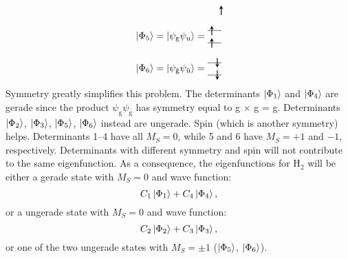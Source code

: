 \documentclass[../Main/chem532-notes.tex]{subfiles}
\begin{document}
\begin{align}
\begin{tikzpicture}[baseline={([yshift=-.5ex]current bounding box.center)},vertex/.style={anchor=base, minimum size=18pt, inner sep=2pt}]
    \draw[thick,->,>=stealth] (0.15,0.55) -- (0.15,0.9);
  \end{tikzpicture}\\[6pt]
      \ket{\Phi_5} = \ket{\psi_{\mathrm{g}}\psi_{\mathrm{u}}} 
=
  \begin{tikzpicture}[baseline={([yshift=-.5ex]current bounding box.center)},vertex/.style={anchor=base, minimum size=18pt, inner sep=2pt}]
    \draw (0,0.275) -- (0.5,0.275);
    \draw (0,0.725) -- (0.5,0.725);
    \draw[thick,->,>=stealth] (0.15,0.1) -- (0.15,0.45);
    \draw[thick,->,>=stealth] (0.15,0.55) -- (0.15,0.9);
  \end{tikzpicture}\\[6pt]
        \ket{\Phi_6} = \ket{\psi_{\bar{\mathrm{g}}}\psi_{\bar{\mathrm{u}}}} 
=
  \begin{tikzpicture}[baseline={([yshift=-.5ex]current bounding box.center)},vertex/.style={anchor=base, minimum size=18pt, inner sep=2pt}]
    \draw (0,0.275) -- (0.5,0.275);
    \draw (0,0.725) -- (0.5,0.725);
    \draw[thick,<-,>=stealth] (0.35,0.55) -- (0.35,0.9);
    \draw[thick,<-,>=stealth] (0.35,0.1) -- (0.35,0.45);
  \end{tikzpicture}
\end{align}
Symmetry greatly simplifies this problem.
The determinants $\ket{\Phi_1}$ and $\ket{\Phi_4}$ are gerade since the product $\psi_{\mathrm{g}}\psi_{\bar{\mathrm{g}}}$ has symmetry equal to g $\times$ g = g.
Determinants $\ket{\Phi_2}$, $\ket{\Phi_3}$, $\ket{\Phi_5}$, $\ket{\Phi_6}$ instead are ungerade.
Spin (which is another symmetry) helps.
Determinants 1--4 have all $M_S = 0$, while 5 and 6 have $M_S = +1$ and $-1$, respectively.
Determinants with different symmetry and spin will not contribute to the same eigenfunction.
As a consequence, the eigenfunctions for H$_2$ will be either a gerade state with $M_S = 0$ and wave function:
\begin{equation}
C_1 \ket{\Phi_1} + C_4 \ket{\Phi_4},
\end{equation}
or a ungerade state with $M_S = 0$ and wave function:
\begin{equation}
C_2 \ket{\Phi_2} + C_3 \ket{\Phi_3},
\end{equation}
or one of the two ungerade states with $M_S = \pm1$ ($\ket{\Phi_5}$, $\ket{\Phi_6}$).
\end{document}
